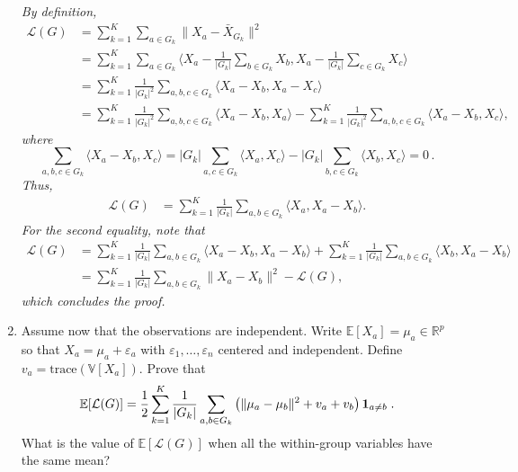 \documentclass[a4paper,10pt,fleqn]{article}
\newcommand{\eqsp}{\,}
\newcommand{\R}{\ensuremath{\mathbb{R}}}
\newcommand{\E}{\ensuremath{\mathbb{E}}}
\newcommand{\V}{\ensuremath{\mathbb{V}}}
\newcommand{\1}{\ensuremath{\mathbbm{1}}}
\newcommand{\eps}{\varepsilon}
\newcommand{\crit}{\mathcal{L}}
\begin{document}
\begin{enumerate}
{\em
By definition,
\begin{align*}
\crit(G) & = \sum_{k=1}^K\sum_{a\in G_{k}}\|X_{a}-\bar{X}_{G_{k}}\|^2 \\
& = \sum_{k=1}^K \sum_{a\in G_{k}} \langle X_a - \frac{1}{|G_k|} \sum_{b \in G_k} X_b,X_a - \frac{1}{|G_k|} \sum_{c \in G_k} X_c \rangle \\
& = \sum_{k=1}^K \frac{1}{|G_k|^2}\sum_{a, b, c\in G_{k}} \langle X_a - X_b,X_a - X_c \rangle \\
& = \sum_{k=1}^K \frac{1}{|G_k|^2}\sum_{a, b, c\in G_{k}} \langle X_a - X_b,X_a \rangle 
- \sum_{k=1}^K \frac{1}{|G_k|^2}\sum_{a, b, c\in G_{k}} \langle X_a - X_b,X_c \rangle,
\end{align*}
where
$$
\sum_{a, b, c\in G_{k}} \langle X_a - X_b,X_c \rangle  = |G_k| \sum_{a, c\in G_{k}} \langle X_a ,X_c \rangle - |G_k| \sum_{b, c\in G_{k}} \langle X_b ,X_c \rangle = 0\eqsp.
$$
Thus, 
\begin{align*}
\crit(G) & = \sum_{k=1}^K \frac{1}{|G_k|}\sum_{a, b\in G_{k}} \langle X_a,X_a -X_b \rangle.
\end{align*}
For the second equality, note that 
\begin{align*}
\crit(G) & = \sum_{k=1}^K \frac{1}{|G_k|}\sum_{a, b\in G_{k}} \langle X_a-X_b,X_a -X_b \rangle + \sum_{k=1}^K \frac{1}{|G_k|}\sum_{a, b\in G_{k}} \langle X_b,X_a -X_b \rangle\\
& = \sum_{k=1}^K \frac{1}{|G_k|}\sum_{a, b\in G_{k}} \| X_a-X_b \|^2 - \crit(G),
\end{align*}
which concludes the proof. 
}
\item Assume now that the observations are independent. Write $\E[X_a] = \mu_{a}\in\R^p$ so that $X_{a}=\mu_{a}+\eps_{a}$ with $\eps_{1},\ldots,\eps_{n}$ centered and independent. Define $v_{a}=\textrm{trace}(\V[X_{a}])$. Prove that
$$
\E[\crit(G)]={1\over 2}\sum_{k=1}^K{1\over |G_{k}|}\sum_{a,b\in G_{k}} \left(\|\mu_{a}-\mu_{b}\|^2+v_{a}+v_{b}\right){\bf 1}_{a\neq b}\;.
$$
What is the value of $\E[\crit(G)]$ when all the within-group variables have the same mean?

\vspace{.2cm}

{\em

}
\end{enumerate}
\end{document}

